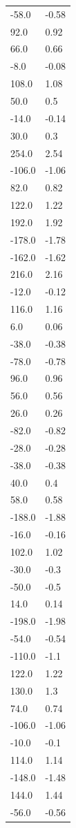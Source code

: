 \begin{longtable}{ll}
-58.0 & -0.58 \\
92.0 & 0.92 \\
66.0 & 0.66 \\
-8.0 & -0.08 \\
108.0 & 1.08 \\
50.0 & 0.5 \\
-14.0 & -0.14 \\
30.0 & 0.3 \\
254.0 & 2.54 \\
-106.0 & -1.06 \\
82.0 & 0.82 \\
122.0 & 1.22 \\
192.0 & 1.92 \\
-178.0 & -1.78 \\
-162.0 & -1.62 \\
216.0 & 2.16 \\
-12.0 & -0.12 \\
116.0 & 1.16 \\
6.0 & 0.06 \\
-38.0 & -0.38 \\
-78.0 & -0.78 \\
96.0 & 0.96 \\
56.0 & 0.56 \\
26.0 & 0.26 \\
-82.0 & -0.82 \\
-28.0 & -0.28 \\
-38.0 & -0.38 \\
40.0 & 0.4 \\
58.0 & 0.58 \\
-188.0 & -1.88 \\
-16.0 & -0.16 \\
102.0 & 1.02 \\
-30.0 & -0.3 \\
-50.0 & -0.5 \\
14.0 & 0.14 \\
-198.0 & -1.98 \\
-54.0 & -0.54 \\
-110.0 & -1.1 \\
122.0 & 1.22 \\
130.0 & 1.3 \\
74.0 & 0.74 \\
-106.0 & -1.06 \\
-10.0 & -0.1 \\
114.0 & 1.14 \\
-148.0 & -1.48 \\
144.0 & 1.44 \\
-56.0 & -0.56 \\

\end{longtable}
